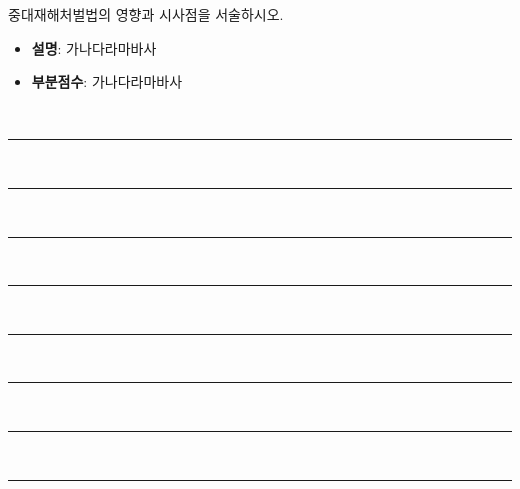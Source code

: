 \documentclass[11pt,answers]{exam} %
\begin{document}
\begin{questions}
\question[10] 중대재해처벌법의 영향과 시사점을 서술하시오.
    \ifprintanswers\relax
        \begin{itemize}
            \item \textbf{설명}: 가나다라마바사
            \item \textbf{부분점수}: 가나다라마바사
        \end{itemize}
    \else
        \\[3pt]
        \rule{\linewidth}{0.4pt} \\[3pt]
        \rule{\linewidth}{0.4pt} \\[3pt]
        \rule{\linewidth}{0.4pt} \\[3pt]
        \rule{\linewidth}{0.4pt} \\[3pt]
        \rule{\linewidth}{0.4pt} \\[3pt]
        \rule{\linewidth}{0.4pt} \\[3pt]
        \rule{\linewidth}{0.4pt} \\[3pt]
        \rule{\linewidth}{0.4pt}
    \fi

\end{questions}
\end{document}
